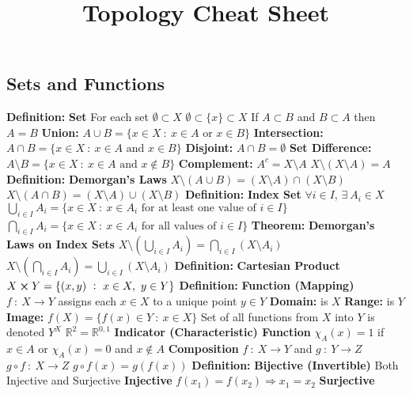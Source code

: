 \documentclass[14pt]{extarticle}
\title{Topology Cheat Sheet}
\def\Definition{{\color{Blue} \textbf{Definition:} }}
\def\Theorem{{\color{Red} \textbf{Theorem:} }}
\begin{document}
	\maketitle


	\begin{outline}	
		\section{Sets and Functions}
		\1	\Definition \textbf{Set}
			\2	For each set $\emptyset \subset X$
			\2	$\emptyset \subset \{x\} \subset X$
			\2	If $A \subset B$ and $B \subset A$ then $A = B$
			\2	\textbf{Union: }$A \cup B = \{x \in X~:~x \in A \text{ or } x \in B\}$
			\2	\textbf{Intersection: }$A \cap B = \{x \in X~:~x \in A \text{ and } x \in B\}$
			\2	\textbf{Disjoint: } $A \cap B = \emptyset$
			\2	\textbf{Set Difference: } $A \setminus B = \{x \in X~:~x \in A \text{ and } x \notin B\}$
			\2	\textbf{Complement: } $A^c = X \setminus A$ 
				\3	$X \setminus (X \setminus A) = A$		
		\1	\Definition \textbf{Demorgan's Laws}
			\2	$X \setminus (A \cup B) = (X \setminus A) \cap (X \setminus B)$
			\2	$X \setminus (A \cap B) = (X \setminus A) \cup (X \setminus B)$
		\1	\Definition \textbf{Index Set}
			\2	$\forall i \in I$, $\exists~A_i \in X$
			\2	$\bigcup_{i \in I}A_i = \{x \in X~:~x \in A_i \text{ for at least one value of } i \in I\}$
			\2	$\bigcap_{i \in I}A_i = \{x \in X~:~x \in A_i \text{ for all values of } i \in I\}$
		\1	\Theorem \textbf{Demorgan's Laws on Index Sets}
			\2	$X \setminus (\bigcup_{i \in I} A_i) = \bigcap_{i \in I}(X \setminus A_i)$
			\2	$X \setminus (\bigcap_{i \in I} A_i) = \bigcup_{i \in I}(X \setminus A_i)$
		\1	\Definition \textbf{Cartesian Product}
			\2	$X \cross Y = \{(x,y)~:~x \in X,~y \in Y\}$
		\1	\Definition \textbf{Function (Mapping)}
			\2	$f~:~X \rightarrow Y$
				\3	assigns each $x \in X$ to a unique point $y \in Y$
				\3	\textbf{Domain: } is $X$
				\3	\textbf{Range: } is $Y$
				\3	\textbf{Image: } $f(X) = \{f(x) \in Y~:~x \in X\}$
				\3	Set of all functions from $X$ into $Y$ is denoted $Y^X$
					\4	$\mathbb{R}^2 = \mathbb{R}^{0,1}$
			\2	\textbf{Indicator (Characteristic) Function}
				\3	$\chi_A(x) = 1$ if $x \in A$ or $\chi_A(x) = 0$ and $x \notin A$
			\2	\textbf{Composition}
				\3	$f~:~X \rightarrow Y$ and $g~:~Y \rightarrow Z$
				\3	$g \circ f~:~X \rightarrow Z$ 
				\3	$g \circ f(x) = g(f(x))$
		\1	\Definition \textbf{Bijective (Invertible)}
			\2	Both Injective and Surjective
			\2	\textbf{Injective}
				\3	$f(x_1) = f(x_2) \Rightarrow x_1 = x_2$
			\2	\textbf{Surjective}

\end{outline}
\end{document}
